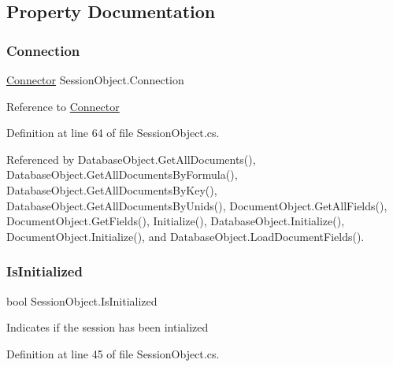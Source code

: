 \subsection{Property Documentation}
\mbox{\label{class_session_object_a014bdbf705a753540e19bfb53030c55c}} 
\subsubsection{\texorpdfstring{Connection}{Connection}}
{\footnotesize\ttfamily \hyperlink{class_connector}{Connector} Session\+Object.\+Connection\hspace{0.3cm}{\ttfamily [get]}}



Reference to \hyperlink{class_connector}{Connector} 



Definition at line 64 of file Session\+Object.\+cs.



Referenced by Database\+Object.\+Get\+All\+Documents(), Database\+Object.\+Get\+All\+Documents\+By\+Formula(), Database\+Object.\+Get\+All\+Documents\+By\+Key(), Database\+Object.\+Get\+All\+Documents\+By\+Unids(), Document\+Object.\+Get\+All\+Fields(), Document\+Object.\+Get\+Fields(), Initialize(), Database\+Object.\+Initialize(), Document\+Object.\+Initialize(), and Database\+Object.\+Load\+Document\+Fields().

\mbox{\label{class_session_object_ae0885b9054fc3ce287307ac16ff69990}} 
\subsubsection{\texorpdfstring{Is\+Initialized}{IsInitialized}}
{\footnotesize\ttfamily bool Session\+Object.\+Is\+Initialized\hspace{0.3cm}{\ttfamily [get]}}



Indicates if the session has been intialized 



Definition at line 45 of file Session\+Object.\+cs.



